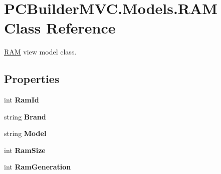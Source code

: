 \hypertarget{class_p_c_builder_m_v_c_1_1_models_1_1_r_a_m}{}\section{P\+C\+Builder\+M\+V\+C.\+Models.\+R\+AM Class Reference}
\label{class_p_c_builder_m_v_c_1_1_models_1_1_r_a_m}


\hyperlink{class_p_c_builder_m_v_c_1_1_models_1_1_r_a_m}{R\+AM} view model class.  


\subsection*{Properties}
\begin{DoxyCompactItemize}
\item 
int {\bfseries Ram\+Id}\hypertarget{class_p_c_builder_m_v_c_1_1_models_1_1_r_a_m_a66f9d91a5f6c76b16dc7640ccf01f132}{}\label{class_p_c_builder_m_v_c_1_1_models_1_1_r_a_m_a66f9d91a5f6c76b16dc7640ccf01f132}

\item 
string {\bfseries Brand}\hypertarget{class_p_c_builder_m_v_c_1_1_models_1_1_r_a_m_a2bae1f446f590d621ee46b3905a9d4da}{}\label{class_p_c_builder_m_v_c_1_1_models_1_1_r_a_m_a2bae1f446f590d621ee46b3905a9d4da}

\item 
string {\bfseries Model}\hypertarget{class_p_c_builder_m_v_c_1_1_models_1_1_r_a_m_afb9b2baf5e3dcfd52b75569a1276ebc4}{}\label{class_p_c_builder_m_v_c_1_1_models_1_1_r_a_m_afb9b2baf5e3dcfd52b75569a1276ebc4}

\item 
int {\bfseries Ram\+Size}\hypertarget{class_p_c_builder_m_v_c_1_1_models_1_1_r_a_m_aac41713f961ead45c86afa8515f571fc}{}\label{class_p_c_builder_m_v_c_1_1_models_1_1_r_a_m_aac41713f961ead45c86afa8515f571fc}

\item 
int {\bfseries Ram\+Generation}\hypertarget{class_p_c_builder_m_v_c_1_1_models_1_1_r_a_m_a065a9f8bf75d9a42db42f1e9a6fcdbdd}{}\label{class_p_c_builder_m_v_c_1_1_models_1_1_r_a_m_a065a9f8bf75d9a42db42f1e9a6fcdbdd}


\end{DoxyCompactItemize}
